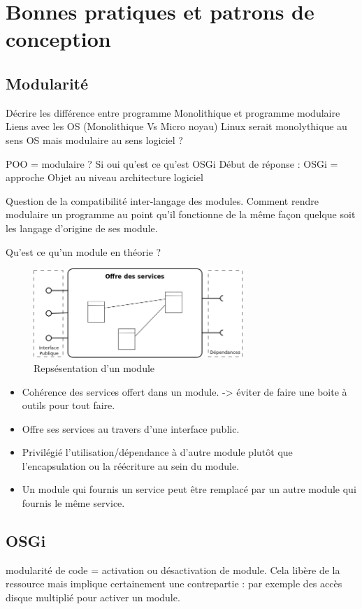\documentclass[a4paper, 11pt]{report}
\begin{document}
\section{Bonnes pratiques et patrons de conception}
\subsection{Modularité}
Décrire les différence entre programme Monolithique et programme modulaire
	Liens avec les OS (Monolithique Vs Micro noyau)
	Linux serait monolythique au sens OS mais modulaire au sens logiciel ?

POO = modulaire ?
	Si oui qu’est ce qu’est OSGi
	Début de réponse : OSGi = approche Objet au niveau architecture logiciel

Question de la compatibilité inter-langage des modules. Comment rendre modulaire un programme au point qu’il fonctionne de la même façon quelque soit les langage d’origine de ses module.

Qu’est ce qu’un module en théorie ?
\begin{figure}
	\begin{center}
		\includegraphics[width=300px]{../../Figures/Bibliographie/modular}
		\caption{Repsésentation d'un module}
	\end{center}
\end{figure}

\begin{itemize}
	\item Cohérence des services offert dans un module. -> éviter de faire une boite à outils pour tout faire.
	\item Offre ses services au travers d’une interface public.
	\item Privilégié l’utilisation/dépendance à d’autre module plutôt que l’encapsulation ou la réécriture au sein du module.
	\item Un module qui fournis un service peut être remplacé par un autre module qui fournis le même service.
\end{itemize}
\subsection{OSGi}
modularité de code = activation ou désactivation de module. Cela libère de la ressource mais implique certainement une contrepartie : par exemple des accès disque multiplié pour activer un module.
\end{document}
